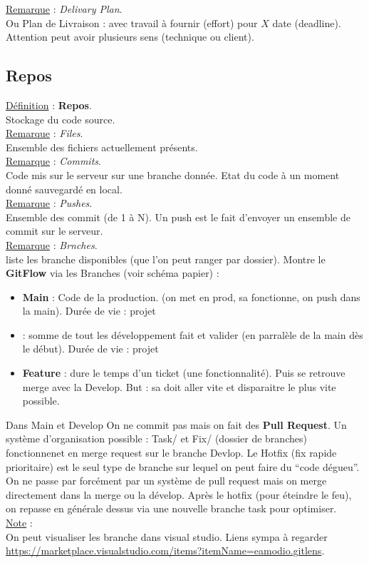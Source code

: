 \documentclass[a4paper,12pt,twoside]{article}
\newcommand{\rem}[2]{\noindent\underline{Remarque} : \textit{#1}.\\ \indent #2}
\newcommand{\note}[1]{\noindent\underline{Note} : \\ \indent #1}
\newcommand{\defi}[2]{\noindent\underline{Définition} : \textbf{#1}.\\ \indent #2}
\begin{document}
\rem{Delivary Plan}{Ou Plan de Livraison : avec travail à fournir (effort) pour $X$ date (deadline). Attention peut avoir plusieurs sens (technique ou client). }\\

\subsection{Repos}

\defi{Repos}{Stockage du code source.}\\

\rem{Files}{Ensemble des fichiers actuellement présents.}\\

\rem{Commits}{Code mis sur le serveur sur une branche donnée. Etat du code à un moment donné sauvegardé en local.}\\

\rem{Pushes}{Ensemble des commit (de 1 à N). Un push est le fait d'envoyer un ensemble de commit sur le serveur.}\\

\rem{Brnches}{liste les branche disponibles (que l'on peut ranger par dossier). Montre le \textbf{GitFlow} via les Branches (voir schéma papier) :
\begin{itemize}  
\item \textbf{Main} : Code de la production. (on met en prod, sa fonctionne, on push dans la main). Durée de vie : projet
\item \tetbf{Develop} : somme de tout les développement fait et valider (en parralèle de la main dès le début). Durée de vie : projet
\item \textbf{Feature} : dure le temps d'un ticket (une fonctionnalité). Puis se retrouve merge avec la Develop. But : sa doit aller vite et disparaitre le plus vite possible.
\end{itemize}
Dans Main et Develop On ne commit pas mais on fait des \textbf{Pull Request}. Un système d'organisation possible : Task/ et Fix/ (dossier de branches) fonctionnenet en merge request sur le branche Devlop. Le Hotfix (fix rapide prioritaire) est le seul type de branche sur lequel on peut faire du ``code dégueu''. On ne passe par forcément par un système de pull request mais on merge directement dans la merge ou la dévelop. Après le hotfix (pour éteindre le feu), on repasse en générale dessus via une nouvelle branche task pour optimiser.\\
}

\note{On peut visualiser les branche dans visual studio. Liens sympa à regarder \url{https://marketplace.visualstudio.com/items?itemName=eamodio.gitlens}.}\\
\end{document}
